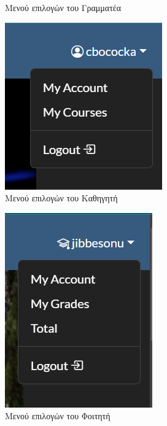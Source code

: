 \documentclass[12pt]{article}
\begin{document}
\begin{figure}[H]
\begin{subfigure}{.22\textwidth}
			\caption{Μενού επιλογών του Γραμματέα}
			\label{fig:sub22}
		\end{subfigure}
		\begin{subfigure}{.22\textwidth}
			\centering
			\includegraphics[width=.8\linewidth]{b2.png}
			\caption{Μενού επιλογών του Καθηγητή}
			\label{fig:sub23}
		\end{subfigure}
		\begin{subfigure}{.22\textwidth}
			\centering
			\includegraphics[width=.8\linewidth]{b3.png}
			\caption{Μενού επιλογών του Φοιτητή}
			\label{fig:sub24}
		\end{subfigure}
		\caption{}
		\label{fig:test1}
	\end{figure}
	
\end{document}
